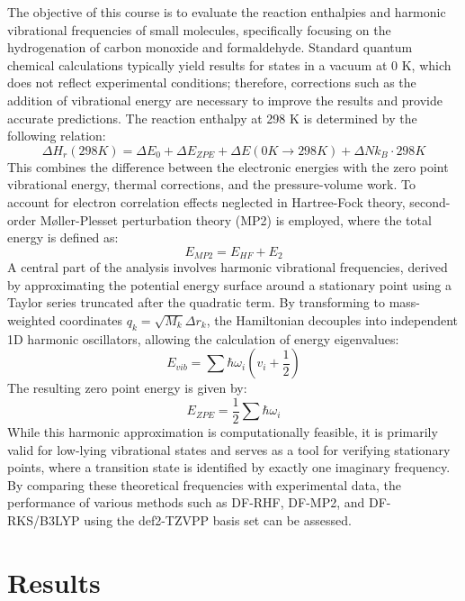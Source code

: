 \documentclass[a4paper,12pt]{scrartcl}
\begin{document}
The objective of this course is to evaluate the reaction enthalpies and harmonic vibrational frequencies of small molecules, specifically focusing on the hydrogenation of carbon monoxide and formaldehyde. Standard quantum chemical calculations typically yield results for states in a vacuum at 0 K, which does not reflect experimental conditions; therefore, corrections such as the addition of vibrational energy are necessary to improve the results and provide accurate predictions. The reaction enthalpy at 298 K is determined by the following relation:
\begin{equation}
\Delta H_r(298 K) = \Delta E_0 + \Delta E_{ZPE} + \Delta E(0 K \rightarrow 298 K) + \Delta N k_B \cdot 298 K
\label{eq1}
\end{equation}
This combines the difference between the electronic energies with the zero point vibrational energy, thermal corrections, and the pressure-volume work. To account for electron correlation effects neglected in Hartree-Fock theory, second-order Møller-Plesset perturbation theory (MP2) is employed, where the total energy is defined as:
\begin{equation}
E_{MP2} = E_{HF} + E_2
\end{equation}
A central part of the analysis involves harmonic vibrational frequencies, derived by approximating the potential energy surface around a stationary point using a Taylor series truncated after the quadratic term. By transforming to mass-weighted coordinates $q_k = \sqrt{M_k} \Delta r_k$, the Hamiltonian decouples into independent 1D harmonic oscillators, allowing the calculation of energy eigenvalues:
\begin{equation}
E_{vib} = \sum \hbar \omega_i \left(v_i + \frac{1}{2}\right)
\end{equation}
The resulting zero point energy is given by:
\begin{equation}
E_{ZPE} = \frac{1}{2} \sum \hbar \omega_i
\end{equation}
While this harmonic approximation is computationally feasible, it is primarily valid for low-lying vibrational states and serves as a tool for verifying stationary points, where a transition state is identified by exactly one imaginary frequency. By comparing these theoretical frequencies with experimental data, the performance of various methods such as DF-RHF, DF-MP2, and DF-RKS/B3LYP using the def2-TZVPP basis set can be assessed.

\section{Results}
\end{document}
